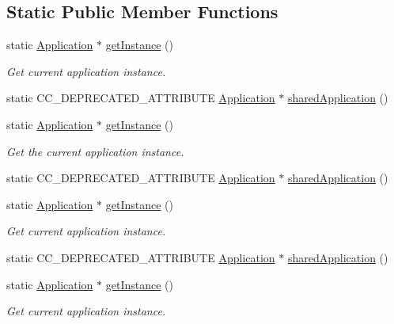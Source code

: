 \subsection*{Static Public Member Functions}
\begin{DoxyCompactItemize}
\item 
static \hyperlink{classApplication}{Application} $\ast$ \hyperlink{classApplication_a723b8bba6edce3769a8d771770ca10e1}{get\+Instance} ()
\begin{DoxyCompactList}\small\item\em Get current application instance. \end{DoxyCompactList}\item 
static C\+C\+\_\+\+D\+E\+P\+R\+E\+C\+A\+T\+E\+D\+\_\+\+A\+T\+T\+R\+I\+B\+U\+TE \hyperlink{classApplication}{Application} $\ast$ \hyperlink{classApplication_aa20c8b14353e12b2f35e147896dd322e}{shared\+Application} ()
\item 
static \hyperlink{classApplication}{Application} $\ast$ \hyperlink{classApplication_ab5dba709d2e806d5d83c297bab6cdace}{get\+Instance} ()
\begin{DoxyCompactList}\small\item\em Get the current application instance. \end{DoxyCompactList}\item 
static C\+C\+\_\+\+D\+E\+P\+R\+E\+C\+A\+T\+E\+D\+\_\+\+A\+T\+T\+R\+I\+B\+U\+TE \hyperlink{classApplication}{Application} $\ast$ \hyperlink{classApplication_a13774a693274456e734b221cea01628c}{shared\+Application} ()
\item 
static \hyperlink{classApplication}{Application} $\ast$ \hyperlink{classApplication_ab5dba709d2e806d5d83c297bab6cdace}{get\+Instance} ()
\begin{DoxyCompactList}\small\item\em Get current application instance. \end{DoxyCompactList}\item 
static C\+C\+\_\+\+D\+E\+P\+R\+E\+C\+A\+T\+E\+D\+\_\+\+A\+T\+T\+R\+I\+B\+U\+TE \hyperlink{classApplication}{Application} $\ast$ \hyperlink{classApplication_a13774a693274456e734b221cea01628c}{shared\+Application} ()
\item 
static \hyperlink{classApplication}{Application} $\ast$ \hyperlink{classApplication_ab5dba709d2e806d5d83c297bab6cdace}{get\+Instance} ()
\begin{DoxyCompactList}\small\item\em Get current application instance. \end{DoxyCompactList}\item 

\end{DoxyCompactItemize}
